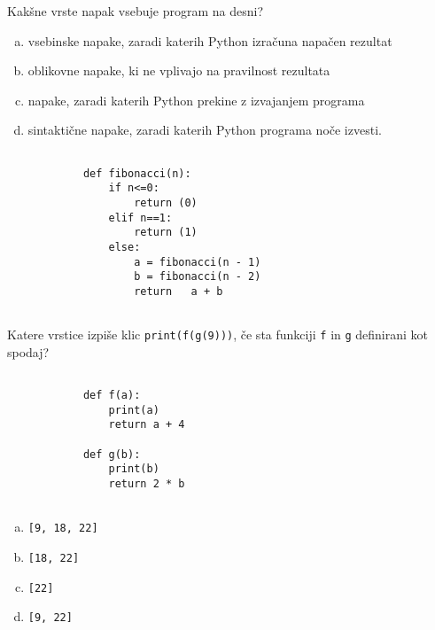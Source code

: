 \documentclass[arhiv, 10pt]{../izpit}
\newcommand{\inlinepy}[1]{\texttt{#1}}
\begin{document}
        \naloga*
        \begin{multicols}{2}
        \noindent
        Kakšne vrste napak vsebuje program na desni?

        \begin{enumerate}[(a)]
\item vsebinske napake, zaradi katerih Python izračuna napačen rezultat
\item oblikovne napake, ki ne vplivajo na pravilnost rezultata
\item napake, zaradi katerih Python prekine z izvajanjem programa
\item sintaktične napake, zaradi katerih Python programa noče izvesti.
\end{enumerate}

        \columnbreak

        \begin{verbatim}
        
            def fibonacci(n):
                if n<=0:
                    return (0)
                elif n==1:
                    return (1)
                else:
                    a = fibonacci(n - 1)
                    b = fibonacci(n - 2)
                    return   a + b
            
        \end{verbatim}

        \end{multicols}

    
        \naloga*
        Katere vrstice izpiše klic \inlinepy{print(f(g(9)))}, če sta funkciji \inlinepy{f} in \inlinepy{g} definirani kot spodaj?

        \begin{multicols}{2}
        \begin{verbatim}
        
            def f(a):
                print(a)
                return a + 4

            def g(b):
                print(b)
                return 2 * b
        
        \end{verbatim}

        \begin{enumerate}[(a)]
\item \inlinepy{[9, 18, 22]}
\item \inlinepy{[18, 22]}
\item \inlinepy{[22]}
\item \inlinepy{[9, 22]}
\end{enumerate}

        \end{multicols}
    
\end{document}
